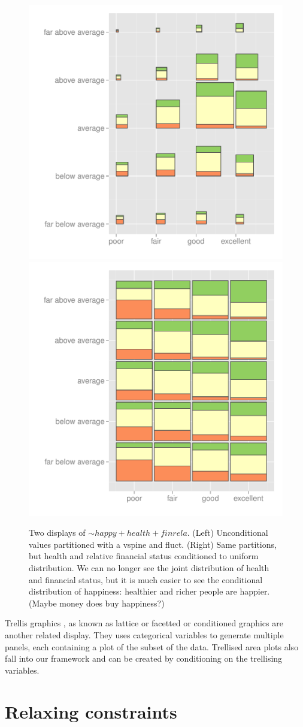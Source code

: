 \documentclass[letterpaper,oneside]{scrartcl}
\begin{document}
\begin{figure}[htbp]
  \centering
    \includegraphics[width=0.5\linewidth]{part-fluctuation}%
    \includegraphics[width=0.5\linewidth]{part-equal-area}
  \caption{Two displays of $\sim happy + health + finrela$.  (Left) Unconditional values partitioned with a vspine and fluct.  (Right) Same partitions, but health and relative financial status conditioned to uniform distribution.  We can no longer see the joint distribution of health and financial status, but it is much easier to see the conditional distribution of happiness: healthier and richer people are happier. (Maybe money does buy happiness?)}
  \label{fig:part-cond}
\end{figure}


Trellis graphics \citep{becker:1996}, as known as lattice or facetted or
conditioned graphics are another related display. They uses categorical
variables to generate multiple panels, each containing a plot of the subset of
the data. Trellised area plots also fall into our framework and can be
created by conditioning on the trellising variables.

\section{Relaxing constraints}
\label{sec:relax}
\end{document}
